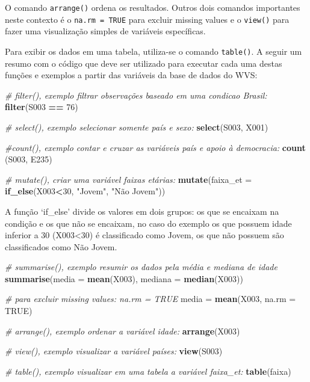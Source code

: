\documentclass[
  brazil,
]{book}
\newenvironment{Shaded}{\begin{snugshade}}{\end{snugshade}}
\newcommand{\CommentTok}[1]{\textcolor[rgb]{0.56,0.35,0.01}{\textit{#1}}}
\newcommand{\DataTypeTok}[1]{\textcolor[rgb]{0.13,0.29,0.53}{#1}}
\newcommand{\DecValTok}[1]{\textcolor[rgb]{0.00,0.00,0.81}{#1}}
\newcommand{\KeywordTok}[1]{\textcolor[rgb]{0.13,0.29,0.53}{\textbf{#1}}}
\newcommand{\NormalTok}[1]{#1}
\newcommand{\OperatorTok}[1]{\textcolor[rgb]{0.81,0.36,0.00}{\textbf{#1}}}
\newcommand{\OtherTok}[1]{\textcolor[rgb]{0.56,0.35,0.01}{#1}}
\newcommand{\StringTok}[1]{\textcolor[rgb]{0.31,0.60,0.02}{#1}}
\begin{document}
O comando \texttt{arrange()} ordena os resultados. Outros dois comandos importantes neste contexto é o \texttt{na.rm\ =\ TRUE} para excluir missing values e o \texttt{view()} para fazer uma visualização simples de variáveis específicas.

Para exibir os dados em uma tabela, utiliza-se o comando \texttt{table()}. A seguir um resumo com o código que deve ser utilizado para executar cada uma destas funções e exemplos a partir das variáveis da base de dados do WVS:

\begin{Shaded}
\begin{Highlighting}[]
\CommentTok{# filter(), exemplo filtrar observações baseado em uma condicao Brasil: }
\KeywordTok{filter}\NormalTok{(S003 }\OperatorTok{==}\StringTok{ }\DecValTok{76}\NormalTok{)}

\CommentTok{# select(), exemplo selecionar somente país e sexo: }
\KeywordTok{select}\NormalTok{(S003, X001)}

\CommentTok{#count(), exemplo contar e cruzar as variáveis país e apoio à democracia: }
\KeywordTok{count}\NormalTok{ (S003, E235) }

\CommentTok{# mutate(), criar uma variável faixas etárias: }
\KeywordTok{mutate}\NormalTok{(}\DataTypeTok{faixa_et =} \KeywordTok{if_else}\NormalTok{(X003}\OperatorTok{<}\DecValTok{30}\NormalTok{, }\StringTok{"Jovem"}\NormalTok{, }\StringTok{"Não Jovem"}\NormalTok{))}
\end{Highlighting}
\end{Shaded}

A função `if\_else' divide os valores em dois grupos: os que se encaixam na condição e os que não se encaixam, no caso do exemplo os que possuem idade inferior a 30 (X003\textless30) é classificado como Jovem, os que não possuem são classificados como Não Jovem.

\begin{Shaded}
\begin{Highlighting}[]
\CommentTok{# summarise(), exemplo resumir os dados pela média e mediana de idade }
\KeywordTok{summarise}\NormalTok{(}\DataTypeTok{media =} \KeywordTok{mean}\NormalTok{(X003), }\DataTypeTok{mediana =} \KeywordTok{median}\NormalTok{(X003))}

\CommentTok{# para excluir missing values: na.rm = TRUE}
\NormalTok{media =}\StringTok{ }\KeywordTok{mean}\NormalTok{(X003, }\DataTypeTok{na.rm =} \OtherTok{TRUE}\NormalTok{)}

\CommentTok{# arrange(), exemplo ordenar a variável idade: }
\KeywordTok{arrange}\NormalTok{(X003)}

\CommentTok{# view(), exemplo visualizar a variável países: }
\KeywordTok{view}\NormalTok{(S003)}

\CommentTok{# table(), exemplo visualizar em uma tabela a variável faixa_et: }
\KeywordTok{table}\NormalTok{(faixa)}
\end{Highlighting}
\end{Shaded}
\end{document}
